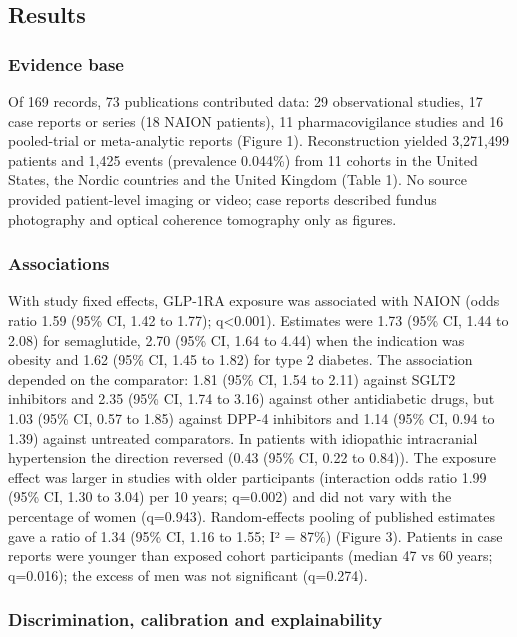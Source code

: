 \documentclass[
  11pt,
]{article}
\begin{document}
\subsection{Results}\label{results}

\subsubsection{Evidence base}\label{evidence-base}

Of 169 records, 73 publications contributed data: 29 observational
studies, 17 case reports or series (18 NAION patients), 11
pharmacovigilance studies and 16 pooled-trial or meta-analytic reports
(Figure 1). Reconstruction yielded 3,271,499 patients and 1,425 events
(prevalence 0.044\%) from 11 cohorts in the United States, the Nordic
countries and the United Kingdom (Table 1). No source provided
patient-level imaging or video; case reports described fundus
photography and optical coherence tomography only as figures.

\subsubsection{Associations}\label{associations}

With study fixed effects, GLP-1RA exposure was associated with NAION
(odds ratio 1.59 (95\% CI, 1.42 to 1.77); q\textless0.001). Estimates
were 1.73 (95\% CI, 1.44 to 2.08) for semaglutide, 2.70 (95\% CI, 1.64
to 4.44) when the indication was obesity and 1.62 (95\% CI, 1.45 to
1.82) for type 2 diabetes. The association depended on the comparator:
1.81 (95\% CI, 1.54 to 2.11) against SGLT2 inhibitors and 2.35 (95\% CI,
1.74 to 3.16) against other antidiabetic drugs, but 1.03 (95\% CI, 0.57
to 1.85) against DPP-4 inhibitors and 1.14 (95\% CI, 0.94 to 1.39)
against untreated comparators. In patients with idiopathic intracranial
hypertension the direction reversed (0.43 (95\% CI, 0.22 to 0.84)). The
exposure effect was larger in studies with older participants
(interaction odds ratio 1.99 (95\% CI, 1.30 to 3.04) per 10 years;
q=0.002) and did not vary with the percentage of women (q=0.943).
Random-effects pooling of published estimates gave a ratio of 1.34 (95\%
CI, 1.16 to 1.55; I² = 87\%) (Figure 3). Patients in case reports were
younger than exposed cohort participants (median 47 vs 60 years;
q=0.016); the excess of men was not significant (q=0.274).

\subsubsection{Discrimination, calibration and
explainability}\label{discrimination-calibration-and-explainability}
\end{document}
